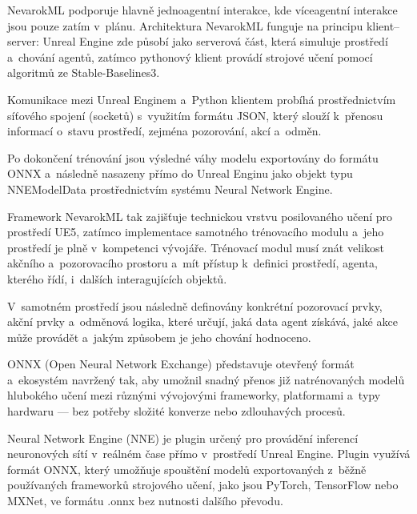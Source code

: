 NevarokML podporuje hlavně jednoagentní interakce, kde víceagentní interakce jsou pouze zatím v~plánu. Architektura NevarokML funguje na principu klient–server: Unreal Engine zde působí jako serverová část, která simuluje prostředí a~chování agentů, zatímco pythonový klient provádí strojové učení pomocí algoritmů ze Stable-Baselines3.

Komunikace mezi Unreal Enginem a~Python klientem probíhá prostřednictvím síťového spojení (socketů) s~využitím formátu JSON, který slouží k~přenosu informací o~stavu prostředí, zejména pozorování, akcí a~odměn.

Po dokončení trénování jsou výsledné váhy modelu exportovány do formátu ONNX a~následně nasazeny přímo do Unreal Enginu jako objekt typu NNEModelData prostřednictvím systému Neural Network Engine.

Framework NevarokML tak zajišťuje technickou vrstvu posilovaného učení pro prostředí UE5, zatímco implementace samotného trénovacího modulu a~jeho prostředí je plně v~kompetenci vývojáře. Trénovací modul musí znát velikost akčního a~pozorovacího prostoru a~mít přístup k~definici prostředí, agenta, kterého řídí, i~dalších interagujících objektů.

V~samotném prostředí jsou následně definovány konkrétní pozorovací prvky, akční prvky a~odměnová logika, které určují, jaká data agent získává, jaké akce může provádět a~jakým způsobem je jeho chování hodnoceno.

ONNX\cite{ONNX2025} (Open Neural Network Exchange) představuje otevřený formát a~ekosystém navržený tak, aby umožnil snadný přenos již natrénovaných modelů hlubokého učení mezi různými vývojovými frameworky, platformami a~typy hardwaru — bez potřeby složité konverze nebo zdlouhavých procesů.

Neural Network Engine (NNE)\cite{NNE2025} je plugin určený pro provádění inferencí neuronových sítí v~reálném čase přímo v~prostředí Unreal Engine. Plugin využívá formát ONNX, který umožňuje spouštění modelů exportovaných z~běžně používaných frameworků strojového učení, jako jsou PyTorch, TensorFlow nebo MXNet, ve formátu .onnx bez nutnosti dalšího převodu.

\newpage

